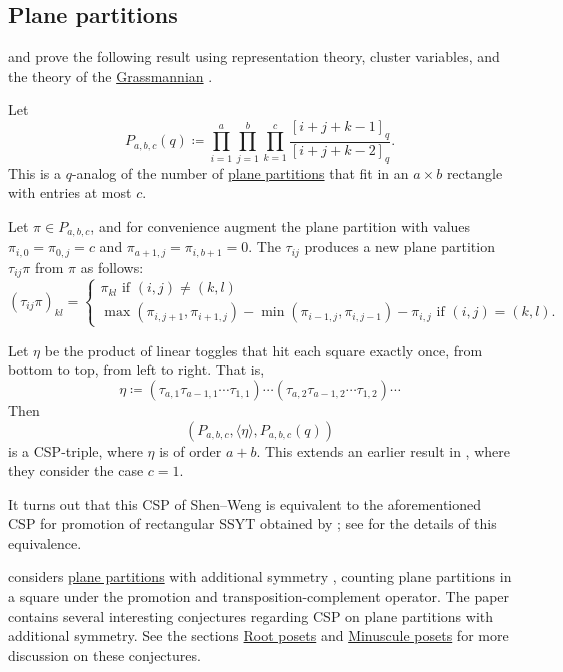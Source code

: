 \subsection[cspPlanePartitions]{Plane partitions}

 and  prove the following result using
representation theory, cluster variables, and the theory of the
\hyperref[grassmannianVarieties]{Grassmannian} \cite{ShenWeng2020}.

Let
\[
P_{a,b,c}(q) \coloneqq \prod_{i=1}^a \prod_{j=1}^b \prod_{k=1}^c \frac{[i+j+k-1]_q}{[i+j+k-2]_q}.
\]
This is a $q$-analog of the number of \hyperref[planePartitions]{plane
partitions} that fit in an $a \times b$ rectangle with entries at most $c$.

Let $\pi \in P_{a,b,c}$, and for convenience augment the plane partition with values
$\pi_{i,0}=\pi_{0,j}=c$ and $\pi_{a+1,j}=\pi_{i,b+1}=0$.
The \label{linearToggle} $\tau_{ij}$ produces a new plane partition $\tau_{ij} \pi$ from $\pi$
as follows:
\[
(\tau_{ij} \pi)_{kl} =
\begin{cases}
\pi_{kl} \text{ if } (i,j)\neq (k,l) \\
\max(\pi_{i,j+1},\pi_{i+1,j} )
-
\min(\pi_{i-1,j},\pi_{i,j-1} ) - \pi_{i,j} \text{ if } (i,j) = (k,l).
\end{cases}
\]

Let $\eta$ be the product of linear toggles that hit each square
exactly once, from bottom to top, from left to right.
That is,
\[
\eta \coloneqq
(\tau_{a,1}\tau_{a-1,1} \dotsm \tau_{1,1})\dotsm
(\tau_{a,2}\tau_{a-1,2}\dotsm \tau_{1,2})\dotsm
\]
Then
\[
\left(P_{a,b,c}, \langle \eta \rangle, P_{a,b,c}(q) \right)
\]
is a CSP-triple, where $\eta$ is of order $a+b$.
This extends an earlier result in \cite{RushShi2012}, where they consider the
case $c=1$.

It turns out that this CSP of Shen--Weng is equivalent
to the aforementioned CSP for promotion of rectangular
SSYT obtained by ; see \cite{Hopkins2020} for the details of this equivalence.

 considers \hyperref[planePartitions]{plane partitions}
with additional symmetry \cite{Hopkins2020},
counting plane partitions in a square under the promotion and
transposition-complement operator.  The paper contains several interesting
conjectures regarding CSP on plane partitions with additional symmetry.
See the sections \hyperref[cspListPosetsRoot]{Root posets} and \hyperref[cspListPosetsMinuscule]{Minuscule posets}
for more discussion on these conjectures.



